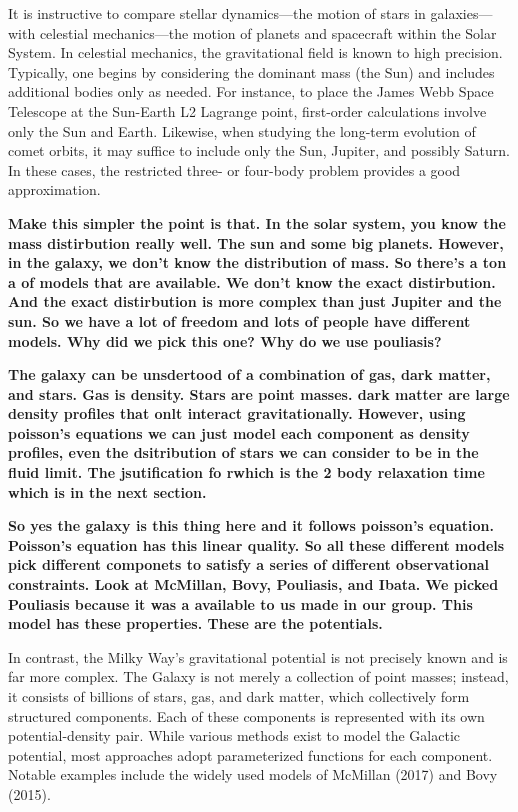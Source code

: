         It is instructive to compare stellar dynamics—the motion of stars in galaxies—with celestial mechanics—the motion of planets and spacecraft within the Solar System. In celestial mechanics, the gravitational field is known to high precision. Typically, one begins by considering the dominant mass (the Sun) and includes additional bodies only as needed. For instance, to place the James Webb Space Telescope at the Sun-Earth L2 Lagrange point, first-order calculations involve only the Sun and Earth. Likewise, when studying the long-term evolution of comet orbits, it may suffice to include only the Sun, Jupiter, and possibly Saturn. In these cases, the restricted three- or four-body problem provides a good approximation.

        \textbf{Make this simpler the point is that. In the solar system, you know the mass distirbution really well. The sun and some big planets. However, in the galaxy, we don't know the distribution of mass. So there's a ton a of models that are available. We don't know the exact distirbution. And the exact distirbution is more complex than just Jupiter and the sun. So we have a lot of freedom and lots of people have different models. Why did we pick this one? Why do we use pouliasis?}


        \textbf{The galaxy can be unsdertood of a combination of gas, dark matter, and stars. Gas is density. Stars are point masses. dark matter are large density profiles that onlt interact gravitationally. However, using poisson's equations we can just model each component as density profiles, even the dsitribution of stars we can consider to be in the fluid limit. The jsutification fo rwhich is the 2 body relaxation time which is in the next section. }


        \textbf{So yes the galaxy is this thing here and it follows poisson's equation. Poisson's equation has this linear quality. So all these different models pick different componets to satisfy a series of different observational constraints. Look at McMillan, Bovy, Pouliasis, and Ibata. We picked Pouliasis because it was a available to us made in our group. This model has these properties. These are the potentials. }
        
        In contrast, the Milky Way's gravitational potential is not precisely known and is far more complex. The Galaxy is not merely a collection of point masses; instead, it consists of billions of stars, gas, and dark matter, which collectively form structured components. Each of these components is represented with its own potential-density pair. While various methods exist to model the Galactic potential, most approaches adopt parameterized functions for each component. Notable examples include the widely used models of McMillan (2017) and Bovy (2015).

